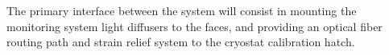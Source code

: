 



The primary interface between the  system will consist in mounting the  monitoring system light diffusers to the  faces, and providing an optical fiber routing path and strain relief system to the cryostat calibration hatch.


